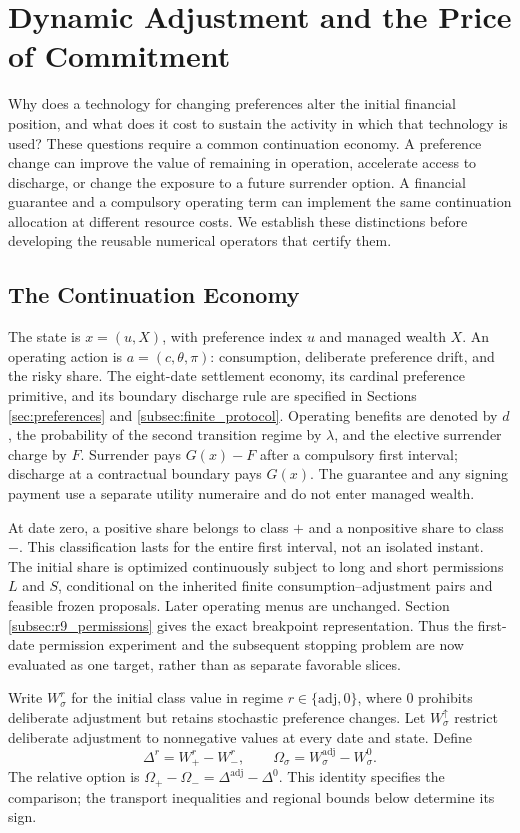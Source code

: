 \section{Dynamic Adjustment and the Price of Commitment}
\label{sec:r11_integrated}
Why does a technology for changing preferences alter the initial financial position, and what does it cost to sustain the activity in which that technology is used? These questions require a common continuation economy. A preference change can improve the value of remaining in operation, accelerate access to discharge, or change the exposure to a future surrender option. A financial guarantee and a compulsory operating term can implement the same continuation allocation at different resource costs. We establish these distinctions before developing the reusable numerical operators that certify them.

\subsection{The Continuation Economy}
The state is $x=(u,X)$, with preference index $u$ and managed wealth $X$. An operating action is $a=(c,\theta,\pi)$: consumption, deliberate preference drift, and the risky share. The eight-date settlement economy, its cardinal preference primitive, and its boundary discharge rule are specified in Sections \ref{sec:preferences} and \ref{subsec:finite_protocol}. Operating benefits are denoted by $d$, the probability of the second transition regime by $\lambda$, and the elective surrender charge by $F$. Surrender pays $G(x)-F$ after a compulsory first interval; discharge at a contractual boundary pays $G(x)$. The guarantee and any signing payment use a separate utility numeraire and do not enter managed wealth.

At date zero, a positive share belongs to class $+$ and a nonpositive share to class $-$. This classification lasts for the entire first interval, not an isolated instant. The initial share is optimized continuously subject to long and short permissions $L$ and $S$, conditional on the inherited finite consumption--adjustment pairs and feasible frozen proposals. Later operating menus are unchanged. Section \ref{subsec:r9_permissions} gives the exact breakpoint representation. Thus the first-date permission experiment and the subsequent stopping problem are now evaluated as one target, rather than as separate favorable slices.

Write $W^r_\sigma$ for the initial class value in regime $r\in\{\mathrm{adj},0\}$, where $0$ prohibits deliberate adjustment but retains stochastic preference changes. Let $W^\uparrow_\sigma$ restrict deliberate adjustment to nonnegative values at every date and state. Define
\begin{equation}
 \Delta^r=W^r_+-W^r_-,\qquad
 \Omega_\sigma=W^{\mathrm{adj}}_\sigma-W^0_\sigma.
 \label{eq:r11_decisions}
\end{equation}
The relative option is $\Omega_+-\Omega_-=\Delta^{\mathrm{adj}}-\Delta^0$. This identity specifies the comparison; the transport inequalities and regional bounds below determine its sign.

